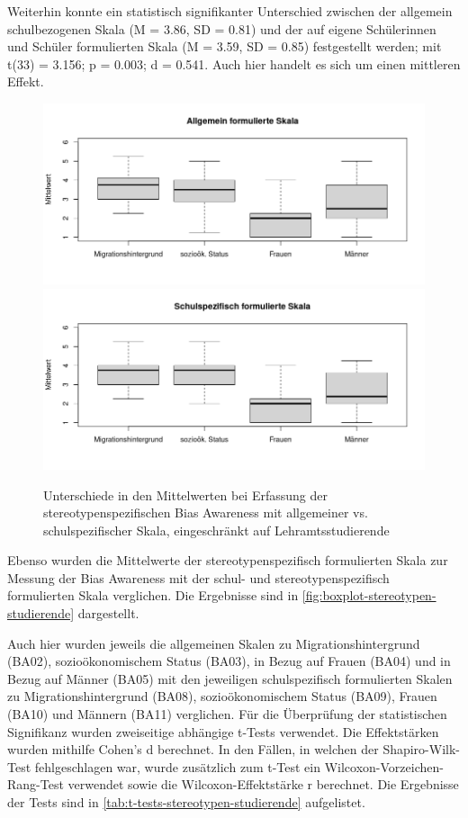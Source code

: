 Weiterhin konnte ein statistisch signifikanter Unterschied zwischen der allgemein schulbezogenen Skala (M = 3.86, SD = 0.81) und der auf eigene Schülerinnen und Schüler formulierten Skala (M = 3.59, SD = 0.85) festgestellt werden; mit t(33) = 3.156; p = 0.003; d = 0.541.
Auch hier handelt es sich um einen mittleren Effekt.

\begin{figure}[h!]
	\includegraphics[width=\textwidth]{resources/boxplot-stereotypen-1-studierende.png}
	\includegraphics[width=\textwidth]{resources/boxplot-stereotypen-2-studierende.png}
	\caption{Unterschiede in den Mittelwerten bei Erfassung der stereotypenspezifischen Bias Awareness mit allgemeiner vs. schulspezifischer Skala, eingeschränkt auf Lehramtsstudierende}
	\label{fig:boxplot-stereotypen-studierende}
\end{figure}

Ebenso wurden die Mittelwerte der stereotypenspezifisch formulierten Skala zur Messung der Bias Awareness mit der schul- und stereotypenspezifisch formulierten Skala verglichen.
Die Ergebnisse sind in \autoref{fig:boxplot-stereotypen-studierende} dargestellt.

Auch hier wurden jeweils die allgemeinen Skalen zu Migrationshintergrund (BA02), sozioökonomischem Status (BA03), in Bezug auf Frauen (BA04) und in Bezug auf Männer (BA05) mit den jeweiligen schulspezifisch formulierten Skalen zu Migrationshintergrund (BA08), sozioökonomischem Status (BA09), Frauen (BA10) und Männern (BA11) verglichen.
Für die Überprüfung der statistischen Signifikanz wurden zweiseitige abhängige t-Tests verwendet.
Die Effektstärken wurden mithilfe Cohen's d berechnet.
In den Fällen, in welchen der Shapiro-Wilk-Test fehlgeschlagen war, wurde zusätzlich zum t-Test ein Wilcoxon-Vorzeichen-Rang-Test verwendet sowie die Wilcoxon-Effektstärke r berechnet.
Die Ergebnisse der Tests sind in \autoref{tab:t-tests-stereotypen-studierende} aufgelistet.

